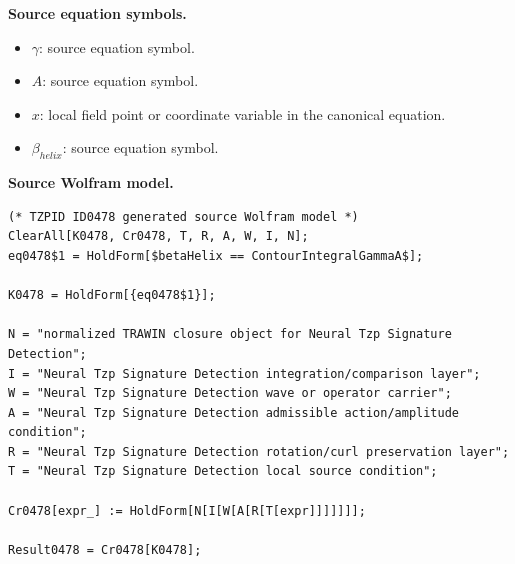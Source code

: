 \begin{minipage}[t]{0.49\linewidth}
\begingroup
\small
\raggedright
\textbf{Source equation symbols.}\par
\begin{itemize}[leftmargin=1.35em,itemsep=1pt,topsep=1pt,parsep=0pt]
    \item $\gamma$: source equation symbol.
    \item $A$: source equation symbol.
    \item $x$: local field point or coordinate variable in the canonical equation.
    \item $\beta_{helix}$: source equation symbol.
\end{itemize}
\endgroup
\end{minipage}\hfill
\begin{minipage}[t]{0.47\linewidth}
\begingroup
\scriptsize
\raggedright
\textbf{Source Wolfram model.}\par
\begin{Verbatim}[fontsize=\tiny,breaklines=true,breakanywhere=true]
(* TZPID ID0478 generated source Wolfram model *)
ClearAll[K0478, Cr0478, T, R, A, W, I, N];
eq0478$1 = HoldForm[$betaHelix == ContourIntegralGammaA$];

K0478 = HoldForm[{eq0478$1}];

N = "normalized TRAWIN closure object for Neural Tzp Signature Detection";
I = "Neural Tzp Signature Detection integration/comparison layer";
W = "Neural Tzp Signature Detection wave or operator carrier";
A = "Neural Tzp Signature Detection admissible action/amplitude condition";
R = "Neural Tzp Signature Detection rotation/curl preservation layer";
T = "Neural Tzp Signature Detection local source condition";

Cr0478[expr_] := HoldForm[N[I[W[A[R[T[expr]]]]]]];

Result0478 = Cr0478[K0478];
\end{Verbatim}
\endgroup
\end{minipage}

